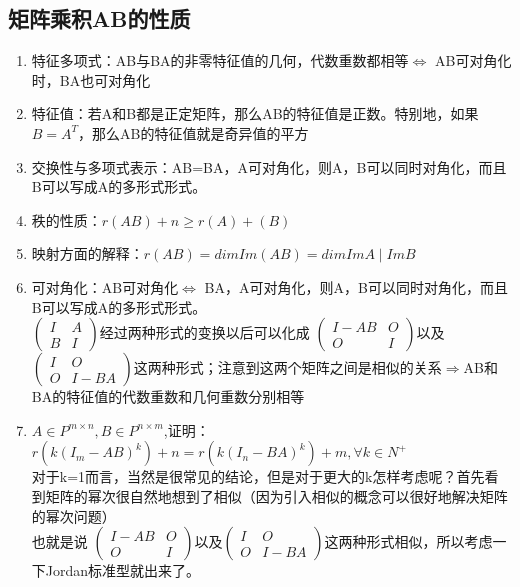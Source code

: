 \documentclass{ctexart}
\begin{document}
\subsection{矩阵乘积AB的性质}
\begin{enumerate} 
    \item 特征多项式：AB与BA的非零特征值的几何，代数重数都相等$\Leftrightarrow$ AB可对角化时，BA也可对角化
    \item 特征值：若A和B都是正定矩阵，那么AB的特征值是正数。特别地，如果$B=A^T$，那么AB的特征值就是奇异值的平方
    \item 交换性与多项式表示：AB=BA，A可对角化，则A，B可以同时对角化，而且B可以写成A的多形式形式。
    \item 秩的性质：$r(AB)+n\geq r(A)+(B)$
    \item 映射方面的解释：$r(AB)=dim Im(AB)=dim ImA\mid ImB$
    \item 可对角化：AB可对角化$\Leftrightarrow$ BA，A可对角化，则A，B可以同时对角化，而且B可以写成A的多形式形式。\\
    $\begin{pmatrix}
        I&A \\
        B&I
      \end{pmatrix}$经过两种形式的变换以后可以化成 $\begin{pmatrix}
        I-AB&O \\
        O&I
      \end{pmatrix}$以及$\begin{pmatrix}
        I&O \\
        O&I-BA
      \end{pmatrix}$这两种形式；注意到这两个矩阵之间是相似的关系$\Rightarrow $AB和BA的特征值的代数重数和几何重数分别相等
    \item $A\in P^{m \times n},B\in P^{n \times m}$,证明：$r(k(I_m-AB)^k)+n=r(k(I_n-BA)^k)+m,\forall k\in N^+$  \\
    对于k=1而言，当然是很常见的结论，但是对于更大的k怎样考虑呢？首先看到矩阵的幂次很自然地想到了相似（因为引入相似的概念可以很好地解决矩阵的幂次问题）\\
    也就是说 $\begin{pmatrix}
        I-AB&O \\
        O&I
      \end{pmatrix}$以及$\begin{pmatrix}
        I&O \\
        O&I-BA
      \end{pmatrix}$这两种形式相似，所以考虑一下Jordan标准型就出来了。
\end{enumerate}



\newpage





\end{document}
